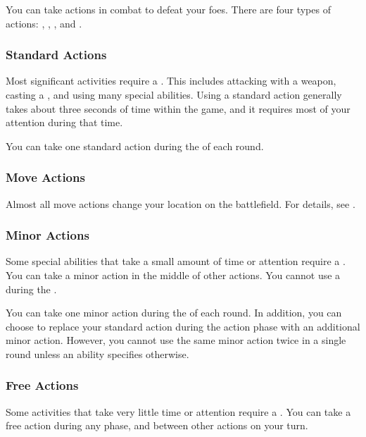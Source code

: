     You can take actions in combat to defeat your foes.
    There are four types of actions: , , , and .

    \subsubsection{Standard Actions}\label{Standard Actions}
      Most significant activities require a .
      This includes attacking with a weapon, casting a , and using many special abilities.
      Using a standard action generally takes about three seconds of time within the game, and it requires most of your attention during that time.

      You can take one standard action during the  of each round.

    \subsubsection{Move Actions}\label{Move Actions}
      Almost all move actions change your location on the battlefield.
      For details, see .

    \subsubsection{Minor Actions}\label{Minor Actions}
      Some special abilities that take a small amount of time or attention require a .
      You can take a minor action in the middle of other actions.
      You cannot use a  during the .

      You can take one minor action during the  of each round.
      In addition, you can choose to replace your standard action during the action phase with an additional minor action.
      However, you cannot use the same minor action twice in a single round unless an ability specifies otherwise.

    \subsubsection{Free Actions}\label{Free Actions}
      Some activities that take very little time or attention require a .
      You can take a free action during any phase, and between other actions on your turn.

